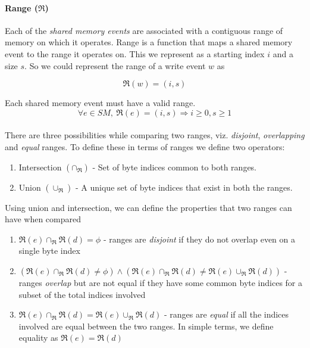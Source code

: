     
        
        \paragraph{Range ($\Re$)}
            Each of the \textit{shared memory events} are associated with a contiguous range of memory on which it operates. Range is a function that maps a shared memory event to the range it operates on. This we represent as a starting index $i$ and a size $s$. So we could represent the range of a write event $w$ as 
                    
                    \[\Re(w) = (i, s) \]
           
            Each shared memory event must have a valid range.  
                    \[\forall {e \in SM},\  \Re(e) = (i, s) \Rightarrow{} i \geq 0, s \geq 1 \]
           
           
            \paragraph{}
            There are three possibilities while comparing two ranges, viz. \textit{disjoint}, \textit{overlapping} and \textit{equal} ranges. To define these in terms of ranges we define two operators:
            
            \begin{enumerate}
                \item Intersection $(\cap{_\Re})$ - Set of byte indices common to both ranges.
                \item Union $(\cup_\Re)$ - A unique set of byte indices that exist in both the ranges.  
            \end{enumerate}
            
            Using union and intersection, we can define the properties that two ranges can have when compared 
            \begin{enumerate}
                \item $\Re(e) \cap_\Re \Re(d) = \phi$ - ranges are \textit{disjoint} if they do not overlap even on a single byte index
                \item $(\Re(e)\cap_\Re \Re(d) \neq \phi) \wedge (\Re(e) \cap_\Re  \Re(d) \neq \Re(e) \cup_\Re \Re(d))$ - ranges \textit{overlap} but are not equal if they have some common byte indices for a subset of the total indices involved
                \item $\Re(e) \cap_\Re  \Re(d) = \Re(e) \cup_\Re \Re(d)$ - ranges are \textit{equal} if all the indices involved are equal between the two ranges. In simple terms, we define equality as $\Re(e) = \Re(d)$
            \end{enumerate}
            
